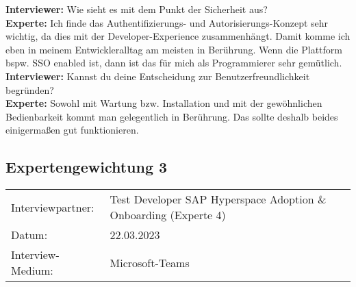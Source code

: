 \begin{linenumbers}
    \textbf{Interviewer:} Wie sieht es mit dem Punkt der Sicherheit aus?\\
    \textbf{Experte:} Ich finde das Authentifizierungs- und Autorisierungs-Konzept sehr wichtig, da dies mit der Developer-Experience zusammenhängt. Damit komme ich eben in meinem Entwickleralltag am meisten in Berührung. Wenn die Plattform bspw. SSO enabled ist, dann ist das für mich als Programmierer sehr gemütlich.\\ 
    \textbf{Interviewer:} Kannst du deine Entscheidung zur Benutzerfreundlichkeit begründen?\\
    \textbf{Experte:} Sowohl mit Wartung bzw. Installation und mit der gewöhnlichen Bedienbarkeit kommt man gelegentlich in Berührung. Das sollte deshalb beides einigermaßen gut funktionieren.\\
\end{linenumbers}

\newpage
\subsection{Expertengewichtung 3}
        \begin{tabular}{ l l }
    Interviewpartner: & Test Developer SAP Hyperspace Adoption \& Onboarding (Experte 4)\\
    Datum: & 22.03.2023\\
    Interview-Medium: & Microsoft-Teams\\
\end{tabular}
\begin{center}
\begin{figure}[H]
    \centering
    \label{fig:CEA}
\end{figure}	
\end{center}
\begin{center}
\begin{figure}[H]
    \centering
    \label{fig:CEA}
\end{figure}	
\end{center}

